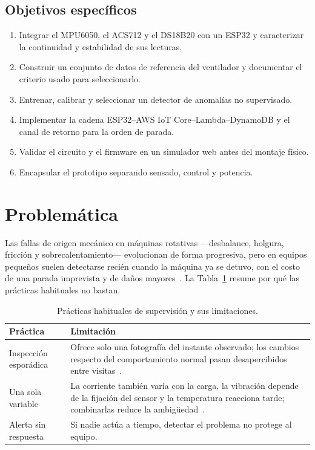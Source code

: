 \documentclass[10pt,twocolumn]{article}
\begin{document}
\subsection*{Objetivos específicos}
\begin{enumerate}
  \item Integrar el MPU6050, el ACS712 y el DS18B20 con un ESP32 y caracterizar la continuidad y
        estabilidad de sus lecturas.
  \item Construir un conjunto de datos de referencia del ventilador y documentar el criterio
        usado para seleccionarlo.
  \item Entrenar, calibrar y seleccionar un detector de anomalías no supervisado.
  \item Implementar la cadena ESP32--AWS IoT Core--Lambda--DynamoDB y el canal de retorno para la
        orden de parada.
  \item Validar el circuito y el firmware en un simulador web antes del montaje físico.
  \item Encapsular el prototipo separando sensado, control y potencia.
\end{enumerate}

\section{Problemática}

Las fallas de origen mecánico en máquinas rotativas ---desbalance, holgura, fricción y
sobrecalentamiento--- evolucionan de forma progresiva, pero en equipos pequeños suelen detectarse
recién cuando la máquina ya se detuvo, con el costo de una parada imprevista y de daños
mayores~\cite{zonta2020,carvalho2019}. La Tabla~\ref{tab:problema} resume por qué las prácticas
habituales no bastan.

\begin{table}[htbp]
\centering
\caption{Prácticas habituales de supervisión y sus limitaciones.}
\label{tab:problema}
\footnotesize
\begin{tabularx}{\columnwidth}{@{}>{\raggedright\arraybackslash}p{2.1cm}>{\raggedright\arraybackslash}X@{}}
\toprule
\textbf{Práctica} & \textbf{Limitación} \\
\midrule
Inspección esporádica & Ofrece solo una fotografía del instante observado; los cambios
respecto del comportamiento normal pasan desapercibidos entre visitas~\cite{carvalho2019,cinar2020}. \\
\addlinespace
Una sola variable & La corriente también varía con la carga, la vibración depende de la
fijación del sensor y la temperatura reacciona tarde; combinarlas reduce la
ambigüedad~\cite{li2017,niu2023}. \\
\addlinespace
Alerta sin respuesta & Si nadie actúa a tiempo, detectar el problema no protege al equipo. \\
\bottomrule
\end{tabularx}
\end{table}
\end{document}
